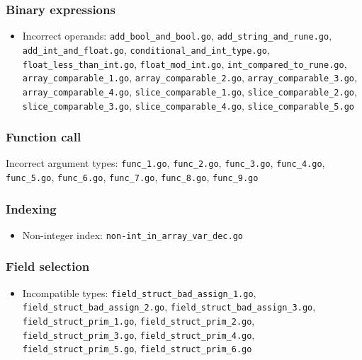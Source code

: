 \documentclass{article}
\begin{document}
\subsubsection*{Binary expressions}

\begin{itemize}
\item Incorrect operands: \texttt{add_bool_and_bool.go}, \texttt{add_string_and_rune.go}, \texttt{add_int_and_float.go}, \texttt{conditional_and_int_type.go}, \texttt{float_less_than_int.go}, \texttt{float_mod_int.go}, \texttt{int_compared_to_rune.go}, \texttt{array_comparable_1.go}, \texttt{array_comparable_2.go}, \texttt{array_comparable_3.go}, \texttt{array_comparable_4.go}, \texttt{slice_comparable_1.go}, \texttt{slice_comparable_2.go}, \texttt{slice_comparable_3.go}, \texttt{slice_comparable_4.go}, \texttt{slice_comparable_5.go}
\end{itemize}

\subsubsection*{Function call}

\item Incorrect argument types: \texttt{func_1.go}, \texttt{func_2.go}, \texttt{func_3.go}, \texttt{func_4.go}, \texttt{func_5.go}, \texttt{func_6.go}, \texttt{func_7.go}, \texttt{func_8.go}, \texttt{func_9.go}

\subsubsection*{Indexing}

\begin{itemize}
\item Non-integer index: \texttt{non-int_in_array_var_dec.go}

\end{itemize}

\subsubsection*{Field selection}

\begin{itemize}
\item Incompatible types: \texttt{field_struct_bad_assign_1.go}, \texttt{field_struct_bad_assign_2.go}, \texttt{field_struct_bad_assign_3.go}, \texttt{field_struct_prim_1.go}, \texttt{field_struct_prim_2.go}, \texttt{field_struct_prim_3.go}, \texttt{field_struct_prim_4.go}, \texttt{field_struct_prim_5.go}, \texttt{field_struct_prim_6.go}
\end{itemize}
\end{document}
